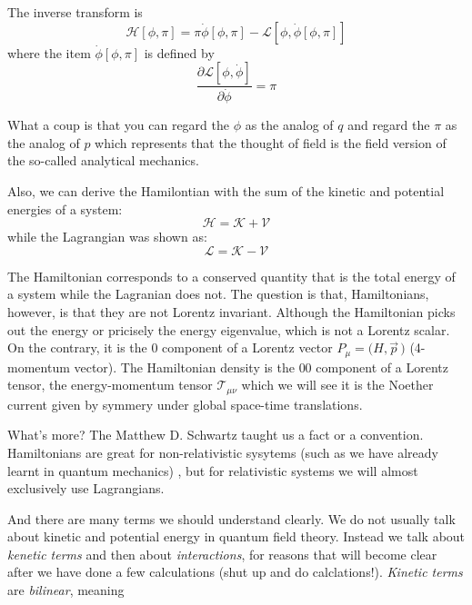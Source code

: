 \documentclass[12pt,openany]{book}
\begin{document}
	The inverse transform is 
	\begin{equation}
		\mathcal{H}[\phi,\pi]=\pi\dot{\phi}[\phi,\pi]-\mathcal{L}[\phi,\dot{\phi}[\phi,\pi]]
	\end{equation}
	where the item $\dot{\phi}[\phi,\pi]$ is defined by
	\begin{equation*}
		\frac{\partial\mathcal{L}[\phi,\dot{\phi}]}{\partial\dot{\phi}}=\pi
	\end{equation*}\par 
	What a coup is that you can regard the $\phi$ as the analog of $q$ and regard the $\pi$ as the analog of $p$ which represents
	that the thought of field is the field version of the so-called analytical mechanics.\par 
	Also, we can derive the Hamilontian with the sum of the kinetic and potential energies of a system:
	\begin{equation}
		\mathcal{H}=\mathcal{K}+\mathcal{V}
	\end{equation}
	while the Lagrangian was shown as:
	\begin{equation}
		\mathcal{L}=\mathcal{K}-\mathcal{V}
	\end{equation}\par 
	The Hamiltonian corresponds to a conserved quantity that is the total energy of a system while the Lagranian does not.
	The question is that, Hamiltonians, however, is that they are not Lorentz invariant. Although the Hamiltonian picks out 
	the energy or pricisely the energy eigenvalue, which is not a Lorentz scalar. On the contrary, it is the $0$ component of 
	a Lorentz vector $P_\mu=\big(H,\vec{p}\,\big)$ (4-momentum vector). The Hamiltonian density is the $00$ component of a Lorentz tensor,
	the energy-momentum tensor $\mathcal{T}_{\mu\nu}$ which we will see it is the Noether current given by symmery under global 
	space-time translations.\par 
	What's more? The Matthew D. Schwartz taught us a fact or a convention. Hamiltonians are great for non-relativistic sysytems (such as we have already learnt in quantum mechanics)
	, but for relativistic systems we will almost exclusively use Lagrangians.\par 
	And there are many terms we should understand clearly. We do not usually talk about kinetic and potential energy in quantum
	field theory. Instead we talk about \textit{kenetic terms} and then about \textit{interactions}, for reasons that will
	become clear after we have done a few calculations (shut up and do calclations!). \textit{Kinetic terms} are \textit{bilinear}, meaning 
\end{document}
